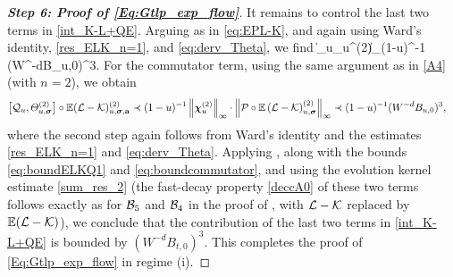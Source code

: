 \begin{proof}[\bf Step 6: Proof of \eqref{Eq:Gtlp_exp_flow}]
It remains to control the last two terms in \eqref{int_K-L+QE}. Arguing as in \eqref{eq:EPL-K}, and again using Ward's identity, \eqref{res_ELK_n=1}, and \eqref{eq:derv_Theta}, we find
\be\label{eq:boundELKQ1}
\left\| \partial_u\dthn_{u}^{(2)}\right\|_\infty \prec (1-u)^{-1} (W^{-d}B_{u,0})^{3}. 
\ee 
For the commutator term, using the same argument as in \eqref{A4} (with $n=2$), we obtain
\begin{align}
\big[{\cal Q}_u , \varTheta^{(2)}_{u,\bsig} \big]\circ \E(\mathcal{L} - \mathcal{K})^{(2)}_{u, \bsig, \ba} %
&\prec (1-u)^{-1}\left\|\dthn^{(2)}_{u}\right\|_\infty \cdot   \left\| {\cal P} \circ \E\left(  \mathcal{L} - \mathcal{K} \right)^{(2)}_{u,\bsig} \right\|_{\infty}\prec (1-u)^{-1} (W^{-d}B_{u,0})^{3},\label{eq:boundcommutator}
\end{align} 
where the second step again follows from Ward's identity and the estimates \eqref{res_ELK_n=1} and \eqref{eq:derv_Theta}. 
Applying , along with the bounds \eqref{eq:boundELKQ1} and \eqref{eq:boundcommutator}, and using the evolution kernel estimate \eqref{sum_res_2} (the fast-decay property \eqref{deccA0} of these two terms follows exactly as for ${\cal B}_5$ and ${\cal B}_4$ in the proof of , with $\cL-\cK$ replaced by $\E(\cL-\cK)$), we conclude that the contribution of the last two terms in \eqref{int_K-L+QE} is bounded by $(W^{-d}B_{t,0})^3$. This completes the proof of \eqref{Eq:Gtlp_exp_flow} in regime (i).

\medskip


\end{proof}
